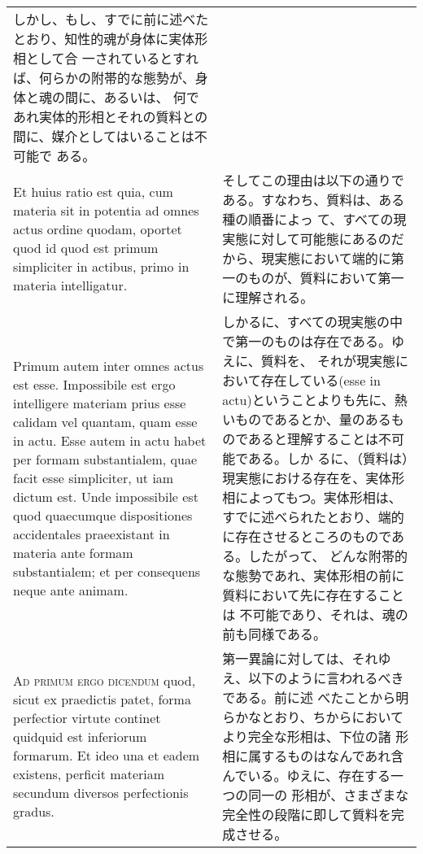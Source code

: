 \documentclass[paper=a4paper,fontsize=10pt,jafontsize=9pt,titlepage]{jlreq}
\begin{document}
\begin{longtable}{p{21em}p{21em}}
しかし、もし、すでに前に述べたとおり、知性的魂が身体に実体形相として合
一されているとすれば、何らかの附帯的な態勢が、身体と魂の間に、あるいは、
何であれ実体的形相とそれの質料との間に、媒介としてはいることは不可能で
ある。
 
\\

 Et huius ratio est quia, cum materia sit in potentia ad omnes actus
 ordine quodam, oportet quod id quod est primum simpliciter in
 actibus, primo in materia intelligatur. 

&

そしてこの理由は以下の通りである。すなわち、質料は、ある種の順番によっ
て、すべての現実態に対して可能態にあるのだから、現実態において端的に第
一のものが、質料において第一に理解される。
 
\\

Primum autem inter omnes actus est esse.  Impossibile est ergo
 intelligere materiam prius esse calidam vel quantam, quam esse in
 actu. Esse autem in actu habet per formam substantialem, quae facit
 esse simpliciter, ut iam dictum est. Unde impossibile est quod
 quaecumque dispositiones accidentales praeexistant in materia ante
 formam substantialem; et per consequens neque ante animam.

&

しかるに、すべての現実態の中で第一のものは存在である。ゆえに、質料を、
それが現実態において存在している(esse in actu)ということよりも先に、熱
いものであるとか、量のあるものであると理解することは不可能である。しか
るに、（質料は）現実態における存在を、実体形相によってもつ。実体形相は、
すでに述べられたとおり、端的に存在させるところのものである。したがって、
どんな附帯的な態勢であれ、実体形相の前に質料において先に存在することは
不可能であり、それは、魂の前も同様である。
 
\\



{\scshape Ad primum ergo dicendum} quod, sicut ex praedictis patet,
forma perfectior virtute continet quidquid est inferiorum formarum. Et
ideo una et eadem existens, perficit materiam secundum diversos
 perfectionis gradus.


&

 第一異論に対しては、それゆえ、以下のように言われるべきである。前に述
 べたことから明らかなとおり、ちからにおいてより完全な形相は、下位の諸
 形相に属するものはなんであれ含んでいる。ゆえに、存在する一つの同一の
 形相が、さまざまな完全性の段階に即して質料を完成させる。
 

\end{longtable}
\end{document}
